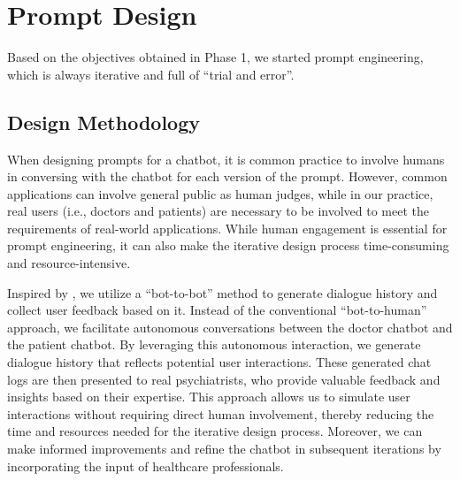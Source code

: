 \section{Prompt Design}
\label{sec:method}

Based on the objectives obtained in Phase 1, we started prompt engineering, which is always iterative and full of ``trial and error''.

\subsection{Design Methodology}
When designing prompts for a chatbot, it is common practice to involve humans in conversing with the chatbot for each version of the prompt. However, common applications can involve general public as human judges, while in our practice, real users (i.e., doctors and patients) are necessary to be involved to meet the requirements of real-world applications. While human engagement is essential for prompt engineering, it can also make the iterative design process time-consuming and resource-intensive.

Inspired by \citet{deriu-etal-2020-spot}, we utilize a ``bot-to-bot'' method to generate dialogue history and collect user feedback based on it. 
Instead of the conventional ``bot-to-human'' approach, we facilitate autonomous conversations between the doctor chatbot and the patient chatbot. By leveraging this autonomous interaction, we generate dialogue history that reflects potential user interactions. These generated chat logs are then presented to real psychiatrists, who provide valuable feedback and insights based on their expertise. 
This approach allows us to simulate user interactions without requiring direct human involvement, thereby reducing the time and resources needed for the iterative design process. Moreover, we can make informed improvements and refine the chatbot in subsequent iterations by incorporating the input of healthcare professionals.

